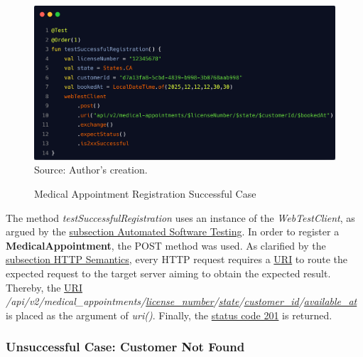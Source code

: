 \begin{figure}[H]
	\centering
	\caption{Medical Appointment Registration Successful Case}
	\includegraphics[width=1\linewidth]{figures/medical_appointment_registration_integration_test_successful_case.png}
	\label{fig:medical_appointment_registration_integration_test_successful_case}
	\footnotesize Source: Author's creation.
\end{figure}

The method \textit{testSuccessfulRegistration} uses an instance of the \textit{WebTestClient}, as argued by the \hyperref[subsection:automated_software_testing]{subsection Automated Software Testing}. In order to register a \textbf{MedicalAppointment}, the POST method was used. As clarified by the \hyperref[subsection:http_semantics]{subsection HTTP Semantics}, every HTTP request requires a \hyperref[appendix:glossary]{URI} to route the expected request to the target server aiming to obtain the expected result. Thereby, the \hyperref[appendix:glossary]{URI} \textit{/api/v2/medical\_appointments/\underline{license\_number}/\underline{state}/\underline{customer\_id}/\underline{available\_at}} is placed as the argument of \textit{uri()}. Finally, the \hyperref[tab:summary_http_status_codes]{status code 201} is returned.

\subsubsection{Unsuccessful Case: Customer Not Found}

